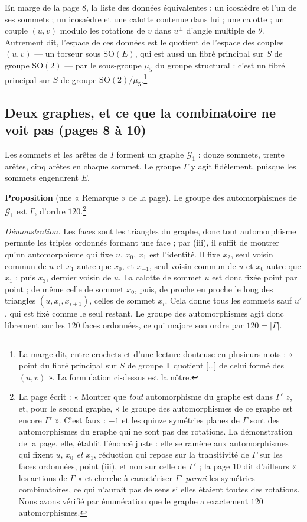 \documentclass[11pt,a4paper]{article}
\begin{document}
En marge de la page 8, la liste des données équivalentes : un icosaèdre et
l'un de ses sommets ; un icosaèdre et une calotte contenue dans lui ; une
calotte ; un couple $(u, v)$ modulo les rotations de $v$ dans $u^{\perp}$
d'angle multiple de $\theta$. Autrement dit, l'espace de ces données est le
quotient de l'espace des couples $(u, v)$ --- un torseur sous
$\mathrm{SO}(E)$, qui est aussi un fibré principal sur $S$ de groupe
$\mathrm{SO}(2)$ --- par le sous-groupe $\mu_5$ du groupe structural :
c'est un fibré principal sur $S$ de groupe
$\mathrm{SO}(2)/\mu_5$.\footnote{La marge dit, entre crochets et d'une
lecture douteuse en plusieurs mots : « point du fibré principal sur $S$ de
groupe $\mathbb{T}$ quotient […] de celui formé des $(u,v)$ ». La
formulation ci-dessus est la nôtre.}

\subsection*{Deux graphes, et ce que la combinatoire ne voit pas (pages 8 à 10)}

Les sommets et les arêtes de $I$ forment un graphe $\mathcal{G}_1$ : douze
sommets, trente arêtes, cinq arêtes en chaque sommet. Le groupe $\Gamma$ y
agit fidèlement, puisque les sommets engendrent $E$.

\textbf{Proposition} (une « Remarque » de la page). Le groupe des
automorphismes de $\mathcal{G}_1$ est $\Gamma$, d'ordre $120$.\footnote{La page écrit : « Montrer que \emph{tout}
automorphisme du graphe est dans $\Gamma'$ », et, pour le second graphe,
« le groupe des automorphismes de ce graphe est encore $\Gamma'$ ». C'est
faux : $-1$ et les quinze symétries planes de $\Gamma$ sont des
automorphismes du graphe qui ne sont pas des rotations. La démonstration de
la page, elle, établit l'énoncé juste : elle se ramène aux automorphismes qui
fixent $u$, $x_0$ \emph{et} $x_1$, réduction qui repose sur la transitivité
de $\Gamma$ sur les faces ordonnées, point (iii), et non sur celle de
$\Gamma'$ ; la page 10 dit d'ailleurs « les actions de $\Gamma$ » et
cherche à caractériser $\Gamma'$ \emph{parmi} les symétries combinatoires,
ce qui n'aurait pas de sens si elles étaient toutes des rotations. Nous avons
vérifié par énumération que le graphe a exactement $120$ automorphismes.}

\emph{Démonstration.} Les faces sont les triangles du graphe, donc tout
automorphisme permute les triples ordonnés formant une face ; par (iii), il
suffit de montrer qu'un automorphisme qui fixe $u$, $x_0$, $x_1$ est
l'identité. Il fixe $x_2$, seul voisin commun de $u$ et $x_1$ autre que
$x_0$, et $x_{-1}$, seul voisin commun de $u$ et $x_0$ autre que $x_1$ ; puis
$x_3$, dernier voisin de $u$. La calotte de sommet $u$ est donc fixée point
par point ; de même celle de sommet $x_0$, puis, de proche en proche le long
des triangles $(u, x_i, x_{i+1})$, celles de sommet $x_i$. Cela donne tous les
sommets sauf $u'$, qui est fixé comme le seul restant. Le groupe des
automorphismes agit donc librement sur les $120$ faces ordonnées, ce qui
majore son ordre par $120 = |\Gamma|$.
\end{document}
